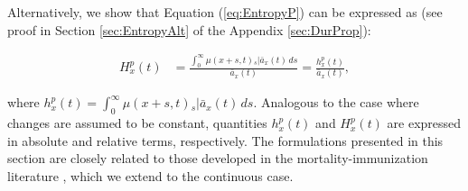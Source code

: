 \documentclass[12pt]{article}
\begin{document}
Alternatively, we show that Equation (\ref{eq:EntropyP}) can be expressed as (see proof in Section \ref{sec:EntropyAlt} of the Appendix \ref{sec:DurProp}):

\begin{equation} \label{eq:EntropyP2}
	\begin{split}
		{H}^{p}_{x}(t) &=  \frac{\int_0^\infty \mu(x+s,t)   {}_s|\bar{a}_x(t) \, ds}{\bar{a}_x(t)} =  \frac{{h}^{p}_{x}(t)}{\bar{a}_x(t)}, 
	\end{split}
\end{equation}

where ${h}^{p}_{x}(t)=\int_0^\infty \mu(x+s,t)   {}_s|\bar{a}_x(t) \, ds$. Analogous to the case where changes are assumed to be constant, quantities ${h}^{p}_{x}(t)$ and ${H}^{p}_{x}(t)$ are expressed in absolute and relative terms, respectively. The formulations presented in this section are closely related to those developed in the mortality-immunization literature \citep{Tsai2013a,Lin2020}, which we extend to the continuous case.
\end{document}
